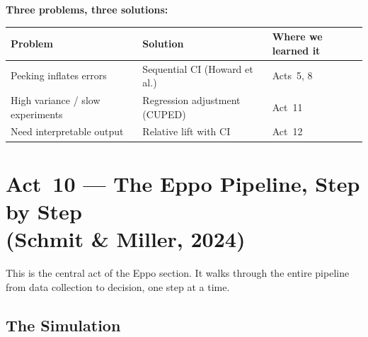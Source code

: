 \documentclass[12pt, a4paper]{article}
\begin{document}
\begin{keytakeaway}
\textbf{Three problems, three solutions:}
\begin{center}
\renewcommand{\arraystretch}{1.3}
\begin{tabular}{@{} l l l @{}}
\toprule
\textbf{Problem} & \textbf{Solution} & \textbf{Where we learned it} \\
\midrule
Peeking inflates errors & Sequential CI (Howard et al.) & Acts~5, 8 \\
High variance / slow experiments & Regression adjustment (CUPED) & Act~11 \\
Need interpretable output & Relative lift with CI & Act~12 \\
\bottomrule
\end{tabular}
\end{center}
\end{keytakeaway}


\newpage
\section{Act~10 --- The Eppo Pipeline, Step by Step\\
         (Schmit \& Miller, 2024)}

This is the central act of the Eppo section.  It walks through the entire
pipeline from data collection to decision, one step at a time.

\subsection{The Simulation}
\end{document}
